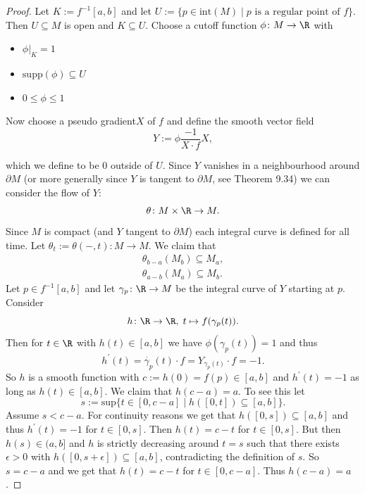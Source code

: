     \begin{proof}
        Let $K := f^{-1}[a,b]$ and let $U := \{p \in \mathrm{int}(M) \mid p \text{ is a regular point of } f\}$. Then $U \subseteq M$ is open and $K \subseteq U$. Choose a cutoff function $\phi \colon M \to \R$ with
        \begin{itemize}
            \item $\phi|_{K} = 1$
            \item $\mathrm{supp}(\phi) \subseteq U$
            \item $0 \leq \phi \leq 1$
        \end{itemize}
        Now choose a pseudo gradient\footnotemark $X$ of $f$ and define the smooth vector field
        \[
            Y := \phi \frac{-1}{X \cdot f} X,
        \]



        \noindent which we define to be $0$ outside of $U$. Since $Y$ vanishes in a neighbourhood around $\partial M$ (or more generally since $Y$ is tangent to $\partial M$, see \cite{lee2011smooth} Theorem 9.34) we can consider the flow of $Y$: 
        \[
        \theta \colon M \times \R \to M.
        \]
        Since $M$ is compact (and $Y$ tangent to $\partial M$) each integral curve is defined for all time. Let $\theta_t := \theta( - ,t) \colon M \to M$. We claim that 
        \begin{align}
            \label{eq:flow1}
            \theta_{b-a}(M_b) \subseteq M_a, \\
            \label{eq:flow2}
            \theta_{a-b}(M_a) \subseteq M_b.
        \end{align}
        Let $p \in f^{-1}[a,b]$ and let $\gamma_p \colon \R \to M$ be the integral curve of $Y$ starting at $p$. Consider
        \[
        h \colon \R \to \R, \; t \mapsto f(\gamma_p(t)).
        \]
        Then for $t \in \R$ with $h(t) \in [a,b]$ we have $\phi(\gamma_p(t)) = 1$ and thus
        \[
        h^\prime(t) = \dot{\gamma_p}(t) \cdot f = Y_{\gamma_p(t)} \cdot f = -1.
        \]
        So $h$ is a smooth function with $c := h(0) = f(p) \in [a,b]$ and $h^\prime(t) = -1$ as long as $h(t) \in [a,b]$. We claim that $h(c-a) = a$. To see this let 
        \[
        s := \mathrm{sup}\{t \in [0,c-a] \mid h([0,t]) \subseteq [a,b]\}.
        \]
        Assume $s < c-a$. For continuity reasons we get that $h([0,s]) \subseteq [a,b]$ and thus $h^\prime(t) = -1$ for $t \in [0,s]$. Then $h(t) = c -t$ for $t \in [0,s]$. But then $h(s) \in (a,b]$ and $h$ is strictly decreasing around $t =s$ such that there exists $\epsilon >0$ with $h([0,s+\epsilon]) \subseteq [a,b]$, contradicting the definition of $s$. So $s = c-a$ and we get that $h(t) = c-t$ for $t \in [0,c-a]$. Thus $h(c-a) = a$.


\end{proof}
